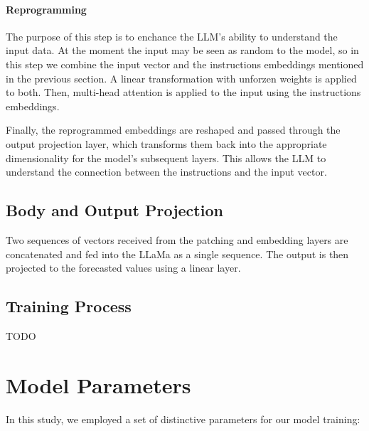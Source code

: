 \paragraph{Reprogramming}
The purpose of this step is to enchance the LLM's ability to understand the input data. At the moment the input may be seen as random to the model, so in this step we combine the input vector and the instructions embeddings mentioned in the previous section. A linear transformation with unforzen weights is applied to both. Then, multi-head attention is applied to the input using the instructions embeddings.

Finally, the reprogrammed embeddings are reshaped and passed through the output projection layer, which transforms them back into the appropriate dimensionality for the model's subsequent layers. This allows the LLM to understand the connection between the instructions and the input vector.

\subsection{Body and Output Projection}
Two sequences of vectors received from the patching and embedding layers are concatenated and fed into the LLaMa as a single sequence. The output is then projected to the forecasted values using a linear layer.


\subsection{Training Process}

TODO

\section{Model Parameters}
In this study, we employed a set of distinctive parameters for our model training:

